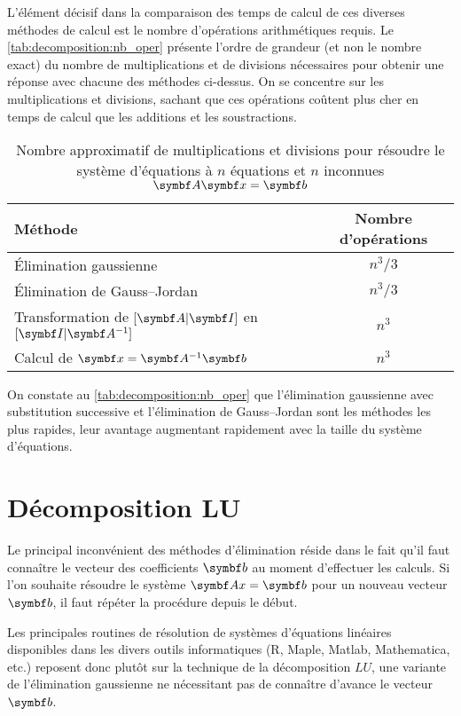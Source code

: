 L'élément décisif dans la comparaison des temps de calcul de ces
diverses méthodes de calcul est le nombre d'opérations arithmétiques
requis. Le \autoref{tab:decomposition:nb_oper} présente l'ordre de
grandeur (et non le nombre exact) du nombre de multiplications et de
divisions nécessaires pour obtenir une réponse avec chacune des
méthodes ci-dessus. On se concentre sur les multiplications et
divisions, sachant que ces opérations coûtent plus cher en temps de
calcul que les additions et les soustractions.
\begin{table}
  \centering
  \begin{tabular}{lc}
    \toprule
    Méthode & Nombre d'opérations \\
    \midrule
    Élimination gaussienne & $n^3/3$ \\
    Élimination de Gauss--Jordan & $n^3/3$ \\
    Transformation de $[\mat{A}|\mat{I}]$ en $[\mat{I}|\mat{A}^{-1}]$ &
    $n^3$ \\
    Calcul de $\mat{x} = \mat{A}^{-1} \mat{b}$ & $n^3$ \\
    \bottomrule
  \end{tabular}
  \caption{Nombre approximatif de multiplications et divisions pour
    résoudre le système d'équations à $n$ équations et $n$ inconnues
    $\mat{A} \mat{x} = \mat{b}$}
  \label{tab:decomposition:nb_oper}
\end{table}

On constate au \autoref{tab:decomposition:nb_oper} que
l'élimination gaussienne avec substitution successive et l'élimination
de Gauss--Jordan sont les méthodes les plus rapides, leur avantage
augmentant rapidement avec la taille du système d'équations.


\section{Décomposition LU}
\label{sec:decomposition:decomposition}

Le principal inconvénient des méthodes d'élimination réside dans le
fait qu'il faut connaître le vecteur des coefficients $\mat{b}$ au
moment d'effectuer les calculs. Si l'on souhaite résoudre le système
$\mat{Ax} = \mat{b}$ pour un nouveau vecteur $\mat{b}$, il faut
répéter la procédure depuis le début.

Les principales routines de résolution de systèmes d'équations
linéaires disponibles dans les divers outils informatiques (R, Maple,
Matlab, Mathematica, etc.) reposent donc plutôt sur la technique de la
décomposition $LU$, une variante de l'élimination gaussienne ne
nécessitant pas de connaître d'avance le vecteur $\mat{b}$.

